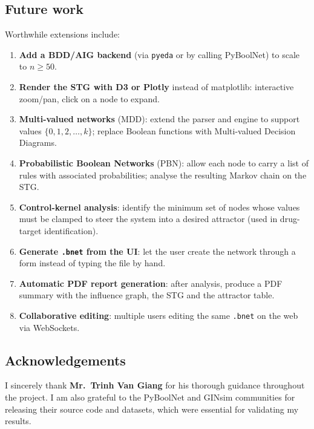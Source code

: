 \documentclass[oneside,final]{hcmut-report}
\begin{document}
\subsection{Future work}\label{subsec:future}

Worthwhile extensions include:

\begin{enumerate}[leftmargin=*]
    \item \textbf{Add a BDD/AIG backend} (via \texttt{pyeda} or by calling PyBoolNet) to scale to $n \geq 50$.
    \item \textbf{Render the STG with D3 or Plotly} instead of matplotlib: interactive zoom/pan, click on a node to expand.
    \item \textbf{Multi-valued networks} (MDD): extend the parser and engine to support values $\{0, 1, 2, \ldots, k\}$; replace Boolean functions with Multi-valued Decision Diagrams.
    \item \textbf{Probabilistic Boolean Networks} (PBN): allow each node to carry a list of rules with associated probabilities; analyse the resulting Markov chain on the STG.
    \item \textbf{Control-kernel analysis}: identify the minimum set of nodes whose values must be clamped to steer the system into a desired attractor (used in drug-target identification).
    \item \textbf{Generate \texttt{.bnet} from the UI}: let the user create the network through a form instead of typing the file by hand.
    \item \textbf{Automatic PDF report generation}: after analysis, produce a PDF summary with the influence graph, the STG and the attractor table.
    \item \textbf{Collaborative editing}: multiple users editing the same \texttt{.bnet} on the web via WebSockets.
\end{enumerate}

\subsection{Acknowledgements}\label{subsec:thanks}

I sincerely thank \textbf{Mr.\ Trinh Van Giang} for his thorough guidance throughout the project. I am also grateful to the PyBoolNet and GINsim communities for releasing their source code and datasets, which were essential for validating my results.

\cleardoublepage
{}
{}
\end{document}
